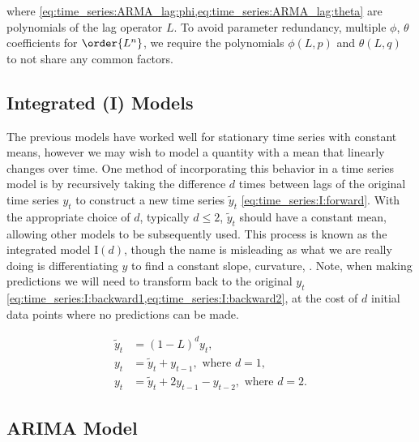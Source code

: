 \noindent where \cref{eq:time_series:ARMA_lag:phi,eq:time_series:ARMA_lag:theta} are polynomials of the lag operator $L$.
To avoid parameter redundancy, \ie multiple $\phi$, $\theta$ coefficients for $\order{L^{n}}$,
we require the polynomials $\phi\left(L,p\right)$ and $\theta\left(L,q\right)$ to not share any common factors.

\subsection{Integrated (I) Models}
\label{additional:time_series:I}

The previous models have worked well for stationary time series with constant means,
however we may wish to model a quantity with a mean that linearly changes over time.
One method of incorporating this behavior in a time series model is by
recursively taking the difference $d$ times between lags of the original time series $y_{t}$
to construct a new time series $\widetilde{y}_{t}$ \cref{eq:time_series:I:forward}.
With the appropriate choice of $d$, typically $d \leq 2$,
$\widetilde{y}_{t}$ should have a constant mean,
allowing other models to be subsequently used.
This process is known as the integrated model $\text{I}\left(d\right)$,
though the name is misleading as what we are really doing is differentiating $y$ to find a constant slope, curvature, \etc.
Note, when making predictions we will need to
transform back to the original $y_{t}$ \cref{eq:time_series:I:backward1,eq:time_series:I:backward2},
at the cost of $d$ initial data points where no predictions can be made.

\begin{subequations}\label{eq:time_series:I}
\begin{align}
\widetilde{y}_{t} &= \left(1-L\right)^{d} y_{t}, \label{eq:time_series:I:forward} \\
y_{t} &= \widetilde{y}_{t} + y_{t-1},\,\, \text{where}\,\, d=1, \label{eq:time_series:I:backward1} \\
y_{t} &= \widetilde{y}_{t} + 2 y_{t-1} - y_{t-2},\,\, \text{where}\,\, d=2. \label{eq:time_series:I:backward2}
\end{align}
\end{subequations}

\subsection{ARIMA Model}
\label{additional:time_series:ARIMA}

